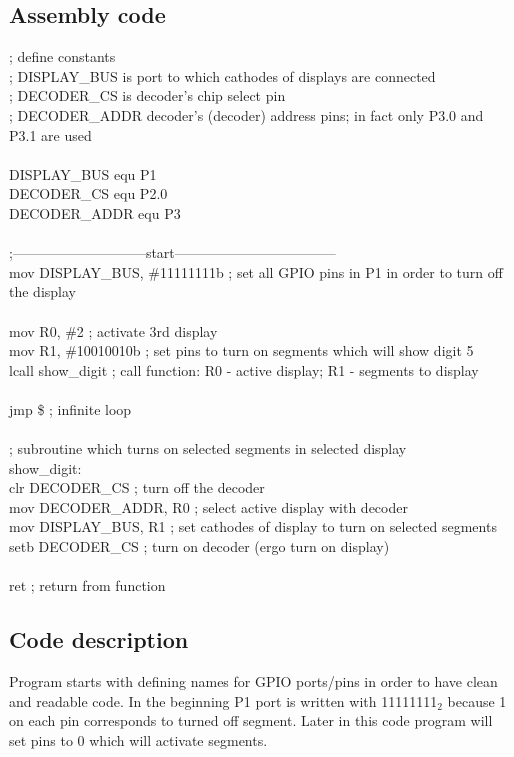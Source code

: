 \documentclass{article}
\begin{document}
\subsection{Assembly code}
\ttfamily
; define constants\\
; DISPLAY\_BUS is port to which cathodes of displays are connected\\
; DECODER\_CS is decoder's chip select pin\\
; DECODER\_ADDR decoder's (decoder) address pins; in fact only P3.0 and P3.1 are used\\
\\
DISPLAY\_BUS     equ     P1\\
DECODER\_CS      equ     P2.0\\
DECODER\_ADDR    equ     P3\\
\\
;-----------------------------start-----------------------------------\\
    mov     DISPLAY\_BUS, \#11111111b ; set all GPIO pins in P1 in order to turn off the display\\
\\
    mov     R0, \#2                  ; activate 3rd display\\
    mov     R1, \#10010010b          ; set pins to turn on segments which will show digit 5\\
    lcall   show\_digit              ; call function: R0 - active display; R1 - segments to display\\
\\
    jmp     \$                       ; infinite loop\\
\\
; subroutine which turns on selected segments in selected display\\
show\_digit:\\
    clr     DECODER\_CS          ; turn off the decoder\\
    mov     DECODER\_ADDR, R0    ; select active display with decoder\\
    mov     DISPLAY\_BUS, R1     ; set cathodes of display to turn on selected segments\\
    setb    DECODER\_CS          ; turn on decoder (ergo turn on display)\\
\\
    ret                          ; return from function

\subsection{Code description}
\rmfamily
Program starts with defining names for GPIO ports/pins in order to have clean and readable
code. In the beginning P1 port is written with 11111111$_2$ because 1 on each pin corresponds
to turned off segment. Later in this code program will set pins to 0 which will activate segments.
\end{document}

